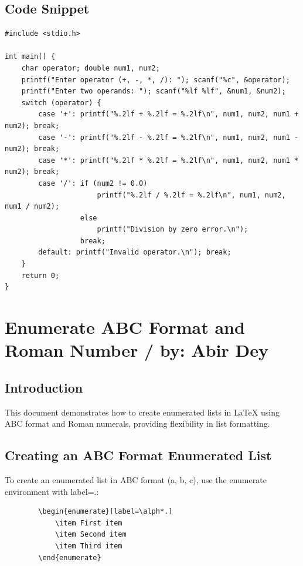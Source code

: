 \documentclass[12pt,a4paper]{article}
\begin{document}
\subsection{Code Snippet}
\begin{verbatim}
#include <stdio.h>

int main() {
    char operator; double num1, num2;
    printf("Enter operator (+, -, *, /): "); scanf("%c", &operator);
    printf("Enter two operands: "); scanf("%lf %lf", &num1, &num2);
    switch (operator) {
        case '+': printf("%.2lf + %.2lf = %.2lf\n", num1, num2, num1 + num2); break;
        case '-': printf("%.2lf - %.2lf = %.2lf\n", num1, num2, num1 - num2); break;
        case '*': printf("%.2lf * %.2lf = %.2lf\n", num1, num2, num1 * num2); break;
        case '/': if (num2 != 0.0) 
                      printf("%.2lf / %.2lf = %.2lf\n", num1, num2, num1 / num2);
                  else 
                      printf("Division by zero error.\n");
                  break;
        default: printf("Invalid operator.\n"); break;
    }
    return 0;
}
\end{verbatim}


	\newpage
	\section{Enumerate ABC Format and Roman Number / by: Abir Dey}
	\subsection{Introduction}
	This document demonstrates how to create enumerated lists in LaTeX using ABC format and Roman numerals, providing flexibility in list formatting.
	
	\subsection{Creating an ABC Format Enumerated List}
	To create an enumerated list in ABC format (a, b, c), use the enumerate environment with label=\alph*.:
	
	\begin{verbatim}
		\begin{enumerate}[label=\alph*.]
			\item First item
			\item Second item
			\item Third item
		\end{enumerate}
	\end{verbatim}
	
\end{document}
